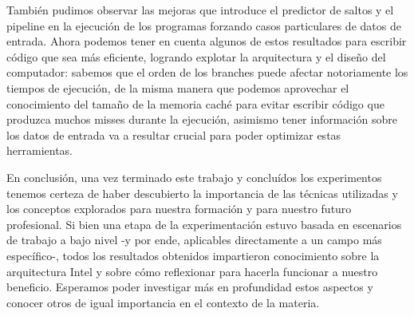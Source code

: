     También pudimos observar las mejoras que introduce el predictor de saltos y el pipeline en la ejecución de los programas forzando casos particulares de datos de entrada. Ahora podemos tener en cuenta algunos de estos resultados para escribir código que sea más eficiente, logrando explotar la arquitectura y el diseño del computador: sabemos que el orden de los branches puede afectar notoriamente los tiempos de ejecución, de la misma manera que podemos aprovechar el conocimiento del tamaño de la memoria caché para evitar escribir código que produzca muchos misses durante la ejecución, asimismo tener información sobre los datos de entrada va a resultar crucial para poder optimizar estas herramientas.

    En conclusión, una vez terminado este trabajo y concluídos los experimentos tenemos certeza de haber descubierto la importancia de las técnicas utilizadas y los conceptos explorados para nuestra formación y para nuestro futuro profesional. Si bien una etapa de la experimentación estuvo basada en escenarios de trabajo a bajo nivel -y por ende, aplicables directamente a un campo más específico-, todos los resultados obtenidos impartieron conocimiento sobre la arquitectura Intel y sobre cómo reflexionar para hacerla funcionar a nuestro beneficio. Esperamos poder investigar más en profundidad estos aspectos y conocer otros de igual importancia en el contexto de la materia.